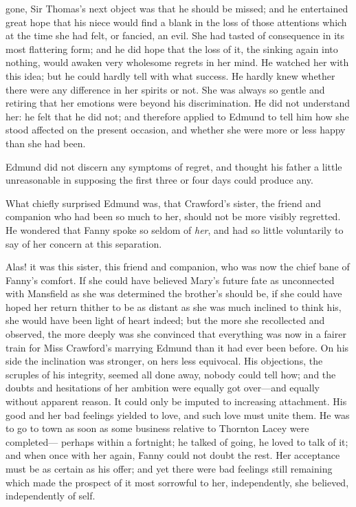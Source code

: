  gone, Sir Thomas's next object was that he
should be missed; and he entertained great hope that his
niece would find a blank in the loss of those attentions
which at the time she had felt, or fancied, an evil.
She had tasted of consequence in its most flattering form;
and he did hope that the loss of it, the sinking again
into nothing, would awaken very wholesome regrets
in her mind.  He watched her with this idea; but he
could hardly tell with what success.  He hardly knew
whether there were any difference in her spirits or not.
She was always so gentle and retiring that her emotions
were beyond his discrimination.  He did not understand her:
he felt that he did not; and therefore applied to Edmund
to tell him how she stood affected on the present occasion,
and whether she were more or less happy than she
had been.

Edmund did not discern any symptoms of regret, and thought
his father a little unreasonable in supposing the first
three or four days could produce any.

What chiefly surprised Edmund was, that Crawford's sister,
the friend and companion who had been so much to her,
should not be more visibly regretted.  He wondered that Fanny
spoke so seldom of \emph{her}, and had so little voluntarily
to say of her concern at this separation.

Alas! it was this sister, this friend and companion,
who was now the chief bane of Fanny's comfort.  If she
could have believed Mary's future fate as unconnected
with Mansfield as she was determined the brother's
should be, if she could have hoped her return thither
to be as distant as she was much inclined to think his,
she would have been light of heart indeed; but the more
she recollected and observed, the more deeply was she
convinced that everything was now in a fairer train
for Miss Crawford's marrying Edmund than it had ever
been before.  On his side the inclination was stronger,
on hers less equivocal.  His objections, the scruples of
his integrity, seemed all done away, nobody could tell how;
and the doubts and hesitations of her ambition were
equally got over---and equally without apparent reason.
It could only be imputed to increasing attachment.
His good and her bad feelings yielded to love, and such
love must unite them.  He was to go to town as soon as
some business relative to Thornton Lacey were completed---%
perhaps within a fortnight; he talked of going,
he loved to talk of it; and when once with her again,
Fanny could not doubt the rest.  Her acceptance must
be as certain as his offer; and yet there were bad
feelings still remaining which made the prospect of it
most sorrowful to her, independently, she believed,
independently of self.

